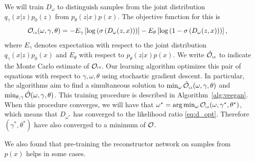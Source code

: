 \documentclass{article}
\newcommand{\Expb}[2]{{E}_{#1}\left[ #2 \right]}
\newcommand{\lr}{\mbox{\tiny\textsc{lr}}}
\begin{document}
We will train $D_\omega$ to distinguish samples from the joint distribution
$q_{\gamma}(x|z)p_{0}(z)$ from $p_{\theta}(z|x) p(x)$. The objective function for this is
\begin{equation}
\label{eq:o3}
\calO_{\lr}(\omega, \gamma, \theta) = -\Expb{\gamma}{\log\left(\sigma \left(D_\omega(z,x)\right)\right)}-  \Expb{\theta}{\log\left( 1-\sigma \left(D_\omega(z,x)\right)\right)},
\end{equation}
where $E_{\gamma}$ denotes expectation with respect
to the joint distribution $q_\gamma(x|z) p_0(x)$ 
and $E_{\theta}$ with respect to $p_\theta(z|x)p(x)$.
We write $\hat{\calO}_{\lr}$ to indicate the Monte Carlo estimate of $\calO{\lr}$.
Our learning algorithm optimizes this pair of equations with respect to $\gamma, \omega, \theta$ using stochastic gradient descent. In particular, the algorithms aim to
find a simultaneous solution to
$\min_{\omega} \hat{\calO}_{\lr} (\omega, \gamma, \theta)$
and $\min_{\theta,\gamma} \hat{\mathcal{O}} (\omega, \gamma, \theta)$.
  This training procedure is described in Algorithm~\ref{alg:veegan}.
When this procedure converges, we will have that
$\omega^* = \arg\min_\omega \calO_{\lr}(\omega, \gamma^*, \theta^*)$,
which means that $D_{\omega^*}$ has converged to the likelihood ratio
\eqref{eq:d_opt}. Therefore $(\gamma^*, \theta^*)$ have also
converged to a minimum of $\mathcal{O}$. 

We also found that pre-training the reconstructor network on samples from $p(x)$ helps in some cases. 
\end{document}
